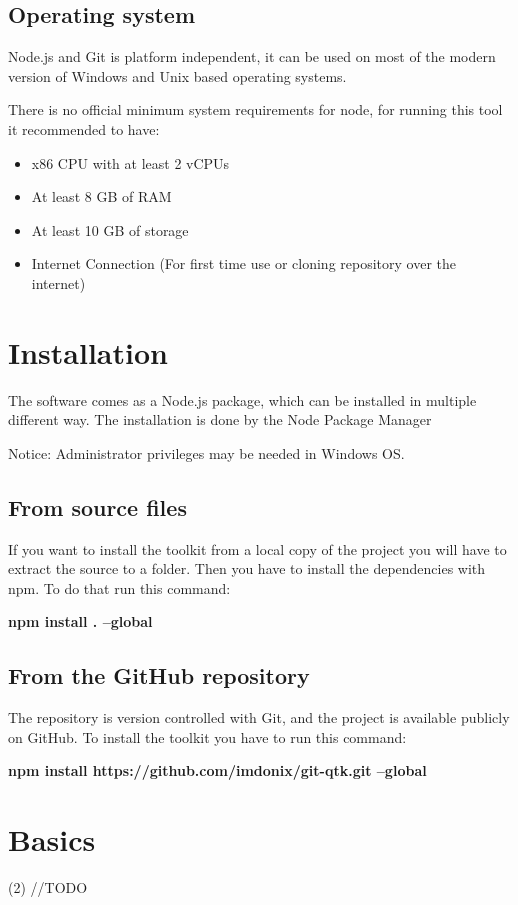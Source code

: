 \subsection{Operating system}
Node.js and Git is platform independent, it can be used on most of the modern version of Windows and Unix based operating systems.\newline

There is no official minimum system requirements for node, for running this tool it recommended to have:

\begin{itemize}
	\item x86 CPU with at least 2 vCPUs
	\item At least 8 GB of RAM
	\item At least 10 GB of storage  
	\item Internet Connection (For first time use or cloning repository over the internet)
\end{itemize}


\section{Installation}
The software comes as a Node.js package, which can be installed in multiple different way. 
The installation is done by the Node Package Manager 

Notice: Administrator privileges may be needed in Windows OS.

\subsection{From source files}
If you want to install the toolkit from a local copy of the project you will have to extract the source to a folder. 
Then you have to install the dependencies with npm.
To do that run this command:

\textbf{npm install . --global}

\subsection{From the GitHub repository}
The repository is version controlled with Git, and the project is available publicly on GitHub. 
To install the toolkit you have to run this command:

\textbf{npm install https://github.com/imdonix/git-qtk.git --global}

\section{Basics} (2)
 //TODO

